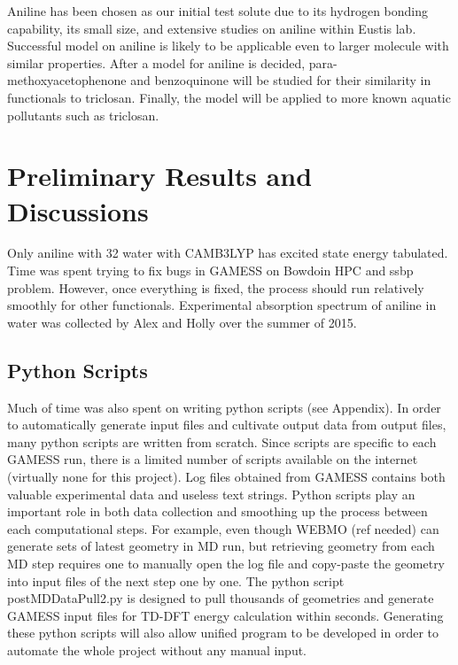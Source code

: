 \documentclass[
journal=jpcbfk, %
manuscript=article]{achemso}
\begin{document}
Aniline has been chosen as our initial test solute due to its hydrogen bonding capability, its small size, and extensive studies on aniline within Eustis lab. Successful model on aniline is likely to be applicable even to larger molecule with similar properties. After a model for aniline is decided, para-methoxyacetophenone and benzoquinone will be studied for their similarity in functionals to triclosan. Finally, the model will be applied to more known aquatic pollutants such as triclosan.
\clearpage

\section{Preliminary Results and Discussions}

Only aniline with 32 water with CAMB3LYP has excited state energy tabulated. Time was spent trying to fix bugs in GAMESS on Bowdoin HPC and ssbp problem. However, once everything is fixed, the process should run relatively smoothly for other functionals. Experimental absorption spectrum of aniline in water was collected by Alex and Holly over the summer of 2015. 

\subsection{Python Scripts}
Much of time was also spent on writing python scripts (see Appendix). In order to automatically generate input files and cultivate output data from output files, many python scripts are written from scratch. Since scripts are specific to each GAMESS run, there is a limited number of scripts available on the internet (virtually none for this project). Log files obtained from GAMESS contains both valuable experimental data and useless text strings. Python scripts play an important role in both data collection and smoothing up the process between each computational steps.  For example, even though WEBMO (ref needed) can generate sets of latest geometry in MD run, but retrieving geometry from each MD step requires one to manually open the log file and copy-paste the geometry into input files of the next step one by one. The python script postMDDataPull2.py is designed to pull thousands of geometries and generate GAMESS input files for TD-DFT energy calculation within seconds. Generating these python scripts will also allow unified program to be developed in order to automate the whole project without any manual input.
\end{document}
